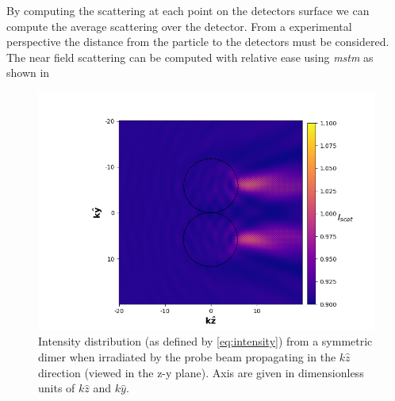 By computing the scattering at each point on the detectors surface 
we can compute the average scattering over the detector. From a
experimental perspective the distance from the particle to the 
detectors must be considered. The near field scattering can be 
computed with relative ease using \textit{mstm} as shown in 
\begin{figure}[h!]
	\centering
	\includegraphics[width=\linewidth]{near_field_intensity_side_profile.png}
	\caption{Intensity distribution (as defined by \eqref{eq:intensity}) 
		from a symmetric dimer when irradiated by the probe beam 
		propagating in the $k\hat{z}$ direction (viewed in the 
		z-y plane). Axis are given in dimensionless units of 
		$k\hat{z}$ and $k\hat{y}$.}
	\label{fig:nf_scattering}
\end{figure}

